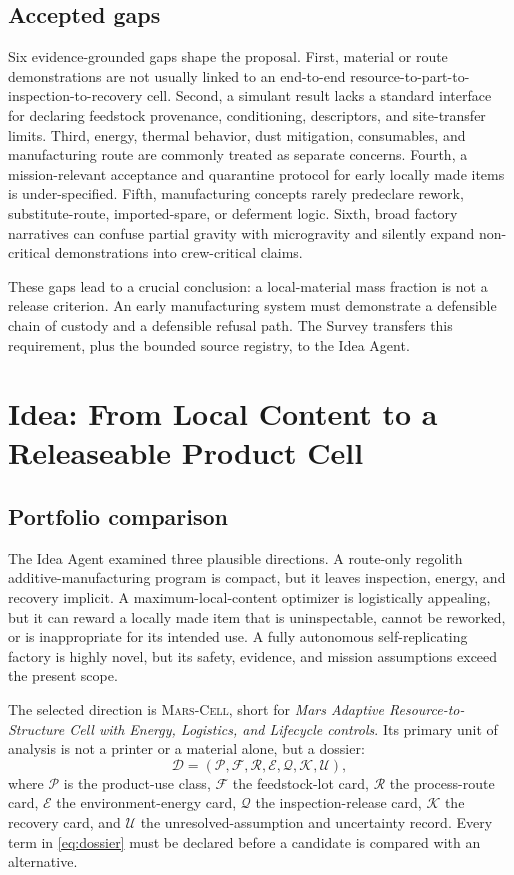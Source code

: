 \documentclass[conference]{../../../../Conference-LaTeX-template_10-17-19/IEEEtran}
\newcommand{\marscell}{\textsc{Mars-Cell}}
\begin{document}
\subsection{Accepted gaps}
Six evidence-grounded gaps shape the proposal. First, material or route demonstrations are not usually linked to an end-to-end resource-to-part-to-inspection-to-recovery cell. Second, a simulant result lacks a standard interface for declaring feedstock provenance, conditioning, descriptors, and site-transfer limits. Third, energy, thermal behavior, dust mitigation, consumables, and manufacturing route are commonly treated as separate concerns. Fourth, a mission-relevant acceptance and quarantine protocol for early locally made items is under-specified. Fifth, manufacturing concepts rarely predeclare rework, substitute-route, imported-spare, or deferment logic. Sixth, broad factory narratives can confuse partial gravity with microgravity and silently expand non-critical demonstrations into crew-critical claims.

These gaps lead to a crucial conclusion: a local-material mass fraction is not a release criterion. An early manufacturing system must demonstrate a defensible chain of custody and a defensible refusal path. The Survey transfers this requirement, plus the bounded source registry, to the Idea Agent.

\section{Idea: From Local Content to a Releaseable Product Cell}
\subsection{Portfolio comparison}
The Idea Agent examined three plausible directions. A route-only regolith additive-manufacturing program is compact, but it leaves inspection, energy, and recovery implicit. A maximum-local-content optimizer is logistically appealing, but it can reward a locally made item that is uninspectable, cannot be reworked, or is inappropriate for its intended use. A fully autonomous self-replicating factory is highly novel, but its safety, evidence, and mission assumptions exceed the present scope.

The selected direction is \marscell{}, short for \emph{Mars Adaptive Resource-to-Structure Cell with Energy, Logistics, and Lifecycle controls}. Its primary unit of analysis is not a printer or a material alone, but a dossier:
\begin{equation}
\mathcal{D}=\left(\mathcal{P},\mathcal{F},\mathcal{R},\mathcal{E},\mathcal{Q},\mathcal{K},\mathcal{U}\right),
\label{eq:dossier}
\end{equation}
where $\mathcal{P}$ is the product-use class, $\mathcal{F}$ the feedstock-lot card, $\mathcal{R}$ the process-route card, $\mathcal{E}$ the environment-energy card, $\mathcal{Q}$ the inspection-release card, $\mathcal{K}$ the recovery card, and $\mathcal{U}$ the unresolved-assumption and uncertainty record. Every term in \eqref{eq:dossier} must be declared before a candidate is compared with an alternative.
\end{document}

